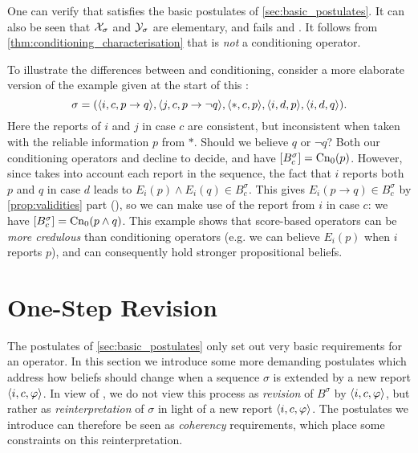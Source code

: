 One can verify that \scorebasedop{} satisfies the basic postulates of
\cref{sec:basic_postulates}. It can also be seen that $\mathcal{X}_\sigma$ and
$\mathcal{Y}_\sigma$ are elementary, and \scorebasedop{} fails \duprem{} and \incvac{}.
It follows from
\cref{thm:conditioning_characterisation} that \scorebasedop{} is \emph{not} a
conditioning operator.\footnotemark{}


\begin{example}
\label{ex:score_based}
     To illustrate the differences between \scorebasedop{} and conditioning,
     consider a more elaborate version of the
     example given at the start of this :
     \[
        \sigma = (
            \langle {i, c, p \rightarrow q} \rangle,
            \langle {j, c, p \rightarrow \neg q} \rangle,
            \langle {\ast, c, p} \rangle,
            \langle {i, d, p} \rangle,
            \langle {i, d, q} \rangle
        ).
     \]
     Here the reports of $i$ and $j$ in case $c$ are consistent,
     but inconsistent when taken with
     the reliable information $p$ from $\ast$. Should we believe $q$ or $\neg
     q$? Both our conditioning operators \varbasedcond{} and \partbasedcond{}
     decline to decide, and have $\left[{B^\sigma_c}\right] = \operatorname{Cn}_0(p)$. However,
     since \scorebasedop{} takes into account each report in the
     sequence, the fact that $i$ reports both $p$ and $q$ in case $d$ leads to
     $E_i(p) \land E_i(q) \in B^\sigma_c$. This gives $E_i(p \rightarrow q)
     \in B^\sigma_c$ by \cref{prop:validities} part
     (), so we can make use of the report
     from $i$ in case $c$: we have $\left[{B^\sigma_c}\right] = \operatorname{Cn}_0(p \land
     q)$.
     This example shows that score-based operators can be \emph{more credulous}
     than conditioning operators (e.g. we can believe $E_i(p)$ when
     $i$ reports $p$), and can consequently hold stronger propositional
     beliefs.

\end{example}

\section{One-Step Revision}
\label{sec:one_step_postulates}

The postulates of \cref{sec:basic_postulates} only set out very basic
requirements for an operator. In this section we introduce some more demanding
postulates which address how beliefs should change when a sequence $\sigma$ is
extended by a new report $\langle {i, c, \varphi} \rangle$.  In view of \rearr{}, we do not
view this process as \emph{revision} of $B^\sigma$ by $\langle {i, c, \varphi} \rangle$, but
rather as \emph{reinterpretation} of $\sigma$ in light of a new report
$\langle {i, c, \varphi} \rangle$. The postulates we introduce can therefore be seen as
\emph{coherency} requirements, which place some constraints on this
reinterpretation.

